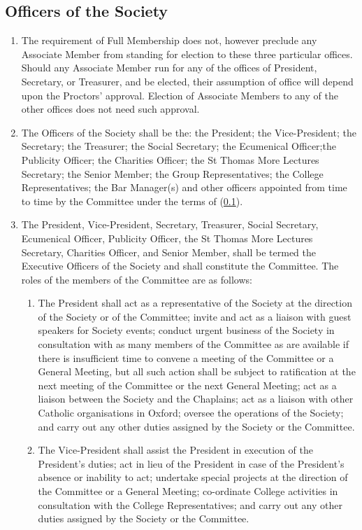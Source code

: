 \documentclass[11pt]{article}
\begin{document}
\subsection{Officers of the Society}\label{byl:off}
\begin{enumerate}
\item The requirement of Full Membership does not, however preclude any Associate Member from standing for election to these three particular offices. Should any Associate Member run for any of the offices of President, Secretary, or Treasurer, and be elected, their assumption of office will depend upon the Proctors' approval. Election of Associate Members to any of the other offices does not need such approval.
\item The Officers of the Society shall be the: the President; the Vice-President; the Secretary; the Treasurer; the Social Secretary; the Ecumenical Officer;the Publicity Officer; the Charities Officer; the St Thomas More Lectures Secretary; the Senior Member; the Group Representatives; the College Representatives; the Bar Manager(s) and other officers appointed from time to time by the Committee under the terms of  (\cref{byl:off}).
\item The President, Vice-President, Secretary, Treasurer, Social Secretary, Ecumenical Officer, Publicity Officer, the St Thomas More Lectures Secretary, Charities Officer, and Senior Member, shall be termed the Executive Officers of the Society and shall constitute the Committee. The roles of the members of the Committee are as follows:
\begin{enumerate}
\item The President shall act as a representative of the Society at the direction of the Society or of the Committee; invite and act as a liaison with guest speakers for Society events; conduct urgent business of the Society in consultation with as many members of the Committee as are available if there is insufficient time to convene a meeting of the Committee or a General Meeting, but all such action shall be subject to ratification at the next meeting of the Committee or the next General Meeting; act as a liaison between the Society and the Chaplains; act as a liaison with other Catholic organisations in Oxford; oversee the operations of the Society; and carry out any other duties assigned by the Society or the Committee.
\item The Vice-President shall assist the President in execution of the President's duties; act in lieu of the President in case of the President's absence or inability to act; undertake special projects at the direction of the Committee or a General Meeting; co-ordinate College activities in consultation with the College Representatives; and carry out any other duties assigned by the Society or the Committee.

\end{enumerate}
\end{enumerate}
\end{document}
